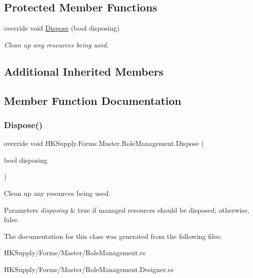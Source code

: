\subsection*{Protected Member Functions}
\begin{DoxyCompactItemize}
\item 
override void \mbox{\hyperlink{class_h_k_supply_1_1_forms_1_1_master_1_1_role_management_aec6f44de37a82c49e6166b2d83e65885}{Dispose}} (bool disposing)
\begin{DoxyCompactList}\small\item\em Clean up any resources being used. \end{DoxyCompactList}\end{DoxyCompactItemize}
\subsection*{Additional Inherited Members}


\subsection{Member Function Documentation}
\mbox{\label{class_h_k_supply_1_1_forms_1_1_master_1_1_role_management_aec6f44de37a82c49e6166b2d83e65885}} 
\subsubsection{\texorpdfstring{Dispose()}{Dispose()}}
{\footnotesize\ttfamily override void H\+K\+Supply.\+Forms.\+Master.\+Role\+Management.\+Dispose (\begin{DoxyParamCaption}\item[{bool}]{disposing }\end{DoxyParamCaption})\hspace{0.3cm}{\ttfamily [protected]}}



Clean up any resources being used. 


\begin{DoxyParams}{Parameters}
{\em disposing} & true if managed resources should be disposed; otherwise, false.\\
\hline
\end{DoxyParams}


The documentation for this class was generated from the following files\+:\begin{DoxyCompactItemize}
\item 
H\+K\+Supply/\+Forms/\+Master/Role\+Management.\+cs\item 
H\+K\+Supply/\+Forms/\+Master/Role\+Management.\+Designer.\+cs\end{DoxyCompactItemize}
